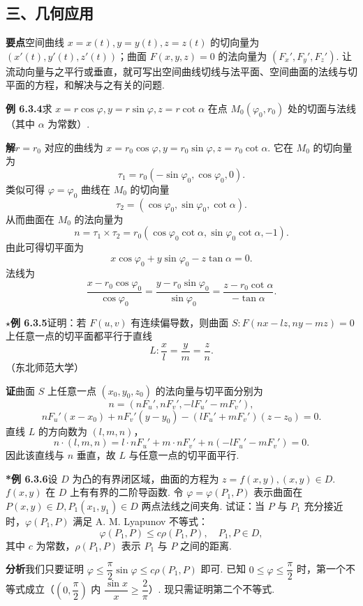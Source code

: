\documentclass[UTF8, 12pt, fontset=fandol, oneside]{ctexart}
\begin{document}
\subsection*{三、几何应用}

\noindent\textbf{要点}\quad 空间曲线 $x=x(t),y=y(t),z=z(t)$ 的切向量为 $(x'(t),y'(t),z'(t))$；曲面 $F(x,y,z)=0$ 的法向量为 $(F_x',F_y',F_z')$. 让流动向量与之平行或垂直，就可写出空间曲线切线与法平面、空间曲面的法线与切平面的方程，和解决与之有关的问题.

\noindent\textbf{例 6.3.4}\quad 求 $x=r\cos\varphi,y=r\sin\varphi,z=r\cot\alpha$ 在点 $M_0(\varphi_0,r_0)$ 处的切面与法线（其中 $\alpha$ 为常数）.

\noindent\textbf{解}\quad $r=r_0$ 对应的曲线为 $x=r_0\cos\varphi,y=r_0\sin\varphi,z=r_0\cot\alpha$. 它在 $M_0$ 的切向量为
\[
  \tau_1=r_0(-\sin\varphi_0,\cos\varphi_0,0).
\]
类似可得 $\varphi=\varphi_0$ 曲线在 $M_0$ 的切向量
\[
  \tau_2=(\cos\varphi_0,\sin\varphi_0,\cot\alpha).
\]
从而曲面在 $M_0$ 的法向量为
\[
  n=\tau_1\times\tau_2
  =r_0(\cos\varphi_0\cot\alpha,\sin\varphi_0\cot\alpha,-1).
\]
由此可得切平面为
\[
  x\cos\varphi_0+y\sin\varphi_0-z\tan\alpha=0.
\]
法线为
\[
  \frac{x-r_0\cos\varphi_0}{\cos\varphi_0}
  =\frac{y-r_0\sin\varphi_0}{\sin\varphi_0}
  =\frac{z-r_0\cot\alpha}{-\tan\alpha}.
\]

\noindent\textbf{\ensuremath{\star}例 6.3.5}\quad 证明：若 $F(u,v)$ 有连续偏导数，则曲面 $S:F(nx-lz,ny-mz)=0$ 上任意一点的切平面都平行于直线
\[
  L:\frac xl=\frac ym=\frac zn.
\]
（东北师范大学）

\noindent\textbf{证}\quad 曲面 $S$ 上任意一点 $(x_0,y_0,z_0)$ 的法向量与切平面分别为
\[
  n=(nF_u',nF_v',-lF_u'-mF_v'),
\]
\[
  nF_u'(x-x_0)+nF_v'(y-y_0)-(lF_u'+mF_v')(z-z_0)=0.
\]
直线 $L$ 的方向数为 $(l,m,n)$，
\[
  n\cdot(l,m,n)=l\cdot nF_u'+m\cdot nF_v'
  +n(-lF_u'-mF_v')=0.
\]
因此该直线与 $n$ 垂直，故 $L$ 与任意一点的切平面平行.

\noindent\textbf{*例 6.3.6}\quad 设 $D$ 为凸的有界闭区域，曲面的方程为 $z=f(x,y),(x,y)\in D$. $f(x,y)$ 在 $D$ 上有有界的二阶导函数. 令 $\varphi=\varphi(P_1,P)$ 表示曲面在 $P(x,y)\in D,P_1(x_1,y_1)\in D$ 两点法线之间夹角. 试证：当 $P$ 与 $P_1$ 充分接近时，$\varphi(P_1,P)$ 满足 A. M. Lyapunov 不等式：
\[
  \varphi(P_1,P)\le c\rho(P_1,P),\quad P_1,P\in D,
\]
其中 $c$ 为常数，$\rho(P_1,P)$ 表示 $P_1$ 与 $P$ 之间的距离.

\noindent\textbf{分析}\quad 我们只要证明 $\varphi\le\dfrac\pi2\sin\varphi\le c\rho(P_1,P)$ 即可. 已知 $0\le\varphi\le\dfrac\pi2$ 时，第一个不等式成立（$\left(0,\dfrac\pi2\right)$ 内 $\dfrac{\sin x}x\ge\dfrac2\pi$）. 现只需证明第二个不等式.
\end{document}
